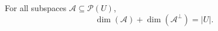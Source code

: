 For all subspaces $\mathcal{A} \subseteq \mathcal{P}(U)$,
$$\dim(\mathcal{A}) + \dim(\mathcal{A}^{\perp}) = |U|.$$
